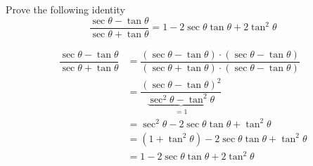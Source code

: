 

\question[1] Prove the following identity
  \[\dfrac{\sec\theta - \tan\theta}{\sec\theta + \tan\theta} = 1-2\sec\theta\tan\theta + 2\tan^2\theta\]


\ifprintanswers
\fi 

\begin{solution}[\halfpage]
	\begin{align}
	   \dfrac{\sec\theta - \tan\theta}{\sec\theta + \tan\theta} &= 
	   \dfrac{(\sec\theta - \tan\theta)\cdot(\sec\theta - \tan\theta)}
	         {(\sec\theta + \tan\theta)\cdot(\sec\theta - \tan\theta)} \\
	     &= \dfrac{(\sec\theta-\tan\theta)^2}{\underbrace{\sec^2\theta-\tan^2\theta}_{=1}} \\
	     &= \sec^2\theta - 2\sec\theta\tan\theta + \tan^2\theta \\
	     &= (1 + \tan^2\theta) - 2\sec\theta\tan\theta + \tan^2\theta \\
	     &= 1 - 2\sec\theta\tan\theta + 2\tan^2\theta
	\end{align}
\end{solution}
